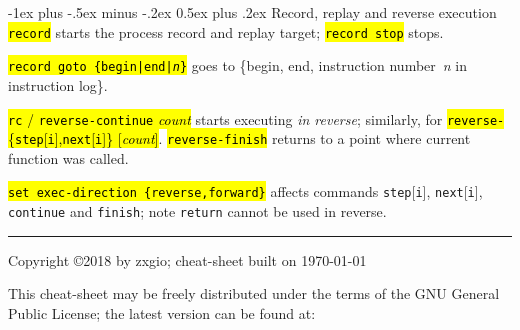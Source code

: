 \documentclass[a4paper,landscape]{article}
\makeatletter
\renewcommand{\section}{\@startsection{section}{1}{0mm}%
                                {-1ex plus -.5ex minus -.2ex}%
                                {0.5ex plus .2ex}%
                                {\normalfont\large\bfseries}}
\makeatother
\begin{document}
\begin{multicols*}{3}
\section{Record, replay and reverse execution}
\hl{\texttt{record}} starts the process record and replay target;
\hl{\texttt{record stop}} stops.

\hl{\texttt{record goto \{\texttt{begin}|\texttt{end}|\textit{n}\}}} goes to \{begin, end, instruction number~\textit{n} in instruction log\}.

\hl{\texttt{rc} / \texttt{reverse-continue} \textit{count}} starts executing \emph{in reverse}; similarly, for \hl{\texttt{reverse-}\{\texttt{step}[\texttt{i}],\texttt{next}[\texttt{i}]\} [\textit{count}]}.
\hl{\texttt{reverse-finish}} returns to a point where current function was called.

\hl{\texttt{set exec-direction \{reverse,forward\}}}
affects commands \texttt{step}[\texttt{i}], \texttt{next}[\texttt{i}], \texttt{continue}
and \texttt{finish}; note \texttt{return} cannot be used in reverse.

\rule{1.0\linewidth}{0.25pt}
\scriptsize
Copyright \copyright 2018 by zxgio; cheat-sheet built on \today

This cheat-sheet may be freely distributed under the terms of the GNU
General Public License; the latest version can be found at: \\
\end{multicols*}
\end{document}
